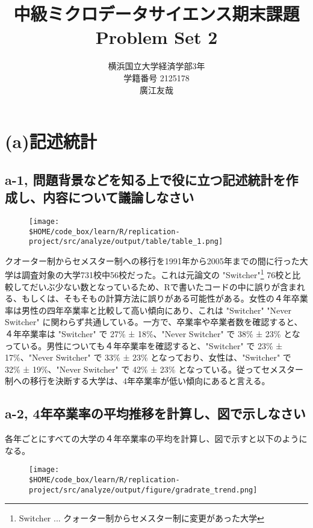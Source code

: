 \documentclass[a4paper]{jsarticle}
\title{中級ミクロデータサイエンス期末課題\\Problem Set 2}
\author{横浜国立大学経済学部3年\\学籍番号 2125178\\廣江友哉}
\begin{document}
\maketitle

\section*{(a)記述統計}

\subsection*{a-1, 問題背景などを知る上で役に立つ記述統計を作成し、内容について議論しなさい}
\begin{figure}[h]
  \centering
  \texttt{[image: \\\$HOME/code\_box/learn/R/replication-project/src/analyze/output/table/table\_1.png]}

\end{figure}

クオーター制からセメスター制への移行を1991年から2005年までの間に行った大学は調査対象の大学731校中56校だった。これは元論文の "Switcher"\footnote{Switcher ... クォーター制からセメスター制に変更があった大学} 76校と比較してだいぶ少ない数となっているため、Rで書いたコードの中に誤りが含まれる、もしくは、そもそもの計算方法に誤りがある可能性がある。女性の４年卒業率は男性の四年卒業率と比較して高い傾向にあり、これは "Switcher" "Never Switcher" に関わらず共通している。一方で、卒業率や卒業者数を確認すると、４年卒業率は "Switcher" で 27\% ± 18\%、"Never Switcher" で 38\% ± 23\% となっている。男性についても４年卒業率を確認すると、"Switcher" で 23\% ± 17\%、"Never Switcher" で 33\% ± 23\% となっており、女性は、"Switcher" で 32\% ± 19\%、"Never Switcher" で 42\% ± 23\% となっている。従ってセメスター制への移行を決断する大学は、4年卒業率が低い傾向にあると言える。

\subsection*{a-2, 4年卒業率の平均推移を計算し、図で示しなさい}

各年ごとにすべての大学の４年卒業率の平均を計算し、図で示すと以下のようになる。

\begin{figure}[H]
  \centering
  \texttt{[image: \\\$HOME/code\_box/learn/R/replication-project/src/analyze/output/figure/gradrate\_trend.png]}

\end{figure}
\end{document}
